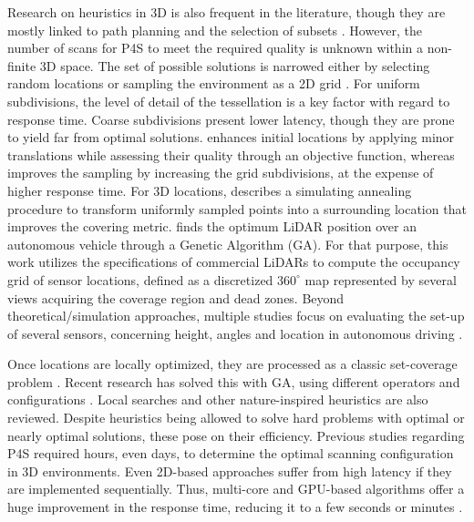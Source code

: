Research on heuristics in 3D is also frequent in the literature, though they are mostly linked to path planning \cite{pehlivanoglu_enhanced_2021} and the selection of subsets \cite{roberge_parallel_2021, pehlivanoglu_enhanced_2021}. However, the number of scans for P4S to meet the required quality is unknown within a non-finite 3D space. The set of possible solutions is narrowed either by selecting random locations \cite{chen_indoor_2018} or sampling the environment as a 2D grid \cite{starek_viewshed_2020, giorgini_sensor-based_2019, jia_comparison_2017}. For uniform subdivisions, the level of detail of the tessellation is a key factor with regard to response time. Coarse subdivisions present lower latency, though they are prone to yield far from optimal solutions. \cite{starek_viewshed_2020} enhances initial locations by applying minor translations while assessing their quality through an objective function, whereas \cite{soudarissanane_optimizing_2012} improves the sampling by increasing the grid subdivisions, at the expense of higher response time. For 3D locations, \cite{starek_viewshed_2020} describes a simulating annealing procedure to transform uniformly sampled points into a surrounding location that improves the covering metric. \cite{kim_placement_2020} finds the optimum LiDAR position over an autonomous vehicle through a Genetic Algorithm (GA). For that purpose, this work utilizes the specifications of commercial LiDARs to compute the occupancy grid of sensor locations, defined as a discretized $360^\circ$ map represented by several views acquiring the coverage region and dead zones. Beyond theoretical/simulation approaches, multiple studies focus on evaluating the set-up of several sensors, concerning height, angles and location in autonomous driving \cite{pereira_self_2016, veronese_accurate_2018}. 

Once locations are locally optimized, they are processed as a classic set-coverage problem \cite{soudarissanane_optimizing_2012}. Recent research has solved this with GA, using different operators and configurations \cite{wang_solving_2018, roostapour_pareto_2022, mohamadi_efficient_2021}. Local searches \cite{li_probability_2021} and other nature-inspired heuristics \cite{islambouli_optimized_2019} are also reviewed. Despite heuristics being allowed to solve hard problems with optimal or nearly optimal solutions, these pose on their efficiency. Previous studies regarding P4S required hours, even days, to determine the optimal scanning configuration in 3D environments. Even 2D-based approaches suffer from high latency \cite{giorgini_sensor-based_2019} if they are implemented sequentially. Thus, multi-core and GPU-based algorithms offer a huge improvement in the response time, reducing it to a few seconds or minutes \cite{giorgini_sensor-based_2019, wang_solving_2018, roberge_parallel_2021}. 

